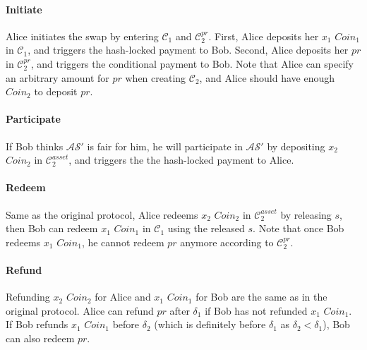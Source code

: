 \paragraph{\textbf{Initiate}}
Alice initiates the swap by entering $\mathcal{C}_1$ and $\mathcal{C}^{pr}_2$.
First, Alice deposits her $x_1$ $Coin_1$ in $\mathcal{C}_1$, and triggers the hash-locked payment to Bob.
Second, Alice deposits her $pr$ in $\mathcal{C}^{pr}_2$, and triggers the conditional payment to Bob.
Note that Alice can specify an arbitrary amount for $pr$ when creating $\mathcal{C}_2$, and Alice should have enough $Coin_2$ to deposit $pr$.

\paragraph{\textbf{Participate}}
If Bob thinks $\mathcal{AS}'$ is fair for him, he will participate in $\mathcal{AS}'$ by depositing $x_2$ $Coin_2$ in $\mathcal{C}^{asset}_2$, and triggers the the hash-locked payment to Alice.

\paragraph{\textbf{Redeem}}
Same as the original protocol, Alice redeems $x_2$ $Coin_2$ in $\mathcal{C}^{asset}_2$ by releasing $s$, then Bob can redeem  $x_1$ $Coin_1$ in $\mathcal{C}_1$ using the released $s$.
Note that once Bob redeems $x_1$ $Coin_1$, he cannot redeem $pr$ anymore according to $\mathcal{C}^{pr}_2$.

\paragraph{\textbf{Refund}}
Refunding $x_2$ $Coin_2$ for Alice and $x_1$ $Coin_1$ for Bob are the same as in the original protocol.
Alice can refund $pr$ after $\delta_1$ if Bob has not refunded $x_1$ $Coin_1$.
If Bob refunds $x_1$ $Coin_1$ before $\delta_2$ (which is definitely before $\delta_1$ as $\delta_2 < \delta_1$), Bob can also redeem $pr$.

